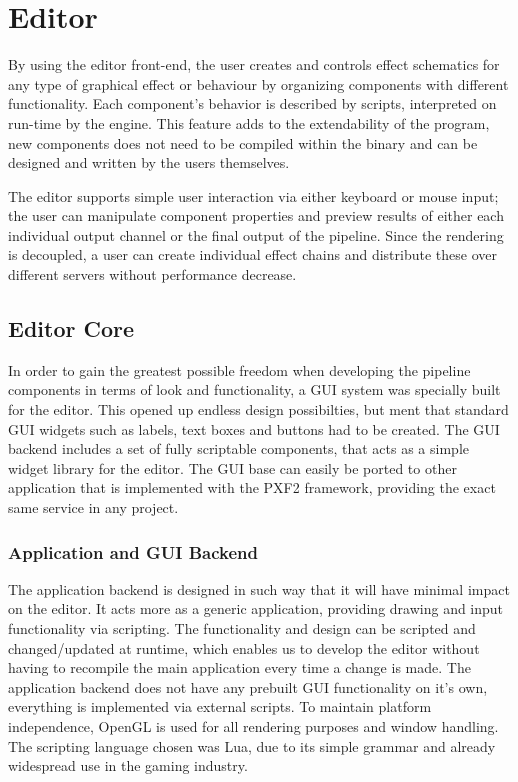 
\chapter{Editor}
 
By using the editor front-end, the user creates and controls effect schematics for any type of graphical effect or behaviour by organizing components with different functionality. Each component’s behavior is described by scripts, interpreted on run-time by the engine. This feature adds to the extendability of the program, new components does not need to be compiled within the binary and can be designed and written by the users themselves.

The editor supports simple user interaction via either keyboard or mouse input; the user can manipulate component properties and preview results of either each individual output channel or the final output of the pipeline. Since the rendering is decoupled, a user can create individual effect chains and distribute these over different servers without performance decrease. 

\section{Editor Core}
In order to gain the greatest possible freedom when developing the pipeline components in terms of look and functionality, a GUI system was specially built for the editor. This opened up endless design possibilties, but ment that standard GUI widgets such as labels, text boxes and buttons had to be created. The GUI backend includes a set of fully scriptable components, that acts as a simple widget library for the editor. The GUI base can easily be ported to other application that is implemented with the PXF2 framework, providing the exact same service in any project. 

\subsection{Application and GUI Backend}
The application backend is designed in such way that it will have minimal impact on the editor. It acts more as a generic application, providing drawing and input functionality via scripting. The functionality and design can be scripted and changed/updated at runtime, which enables us to develop the editor without having to recompile the main application every time a change is made. The application backend does not have any prebuilt GUI functionality on it's own, everything is implemented via external scripts. To maintain platform independence, OpenGL is used for all rendering purposes and window handling. The scripting language chosen was Lua, due to its simple grammar and already widespread use in the gaming industry.

